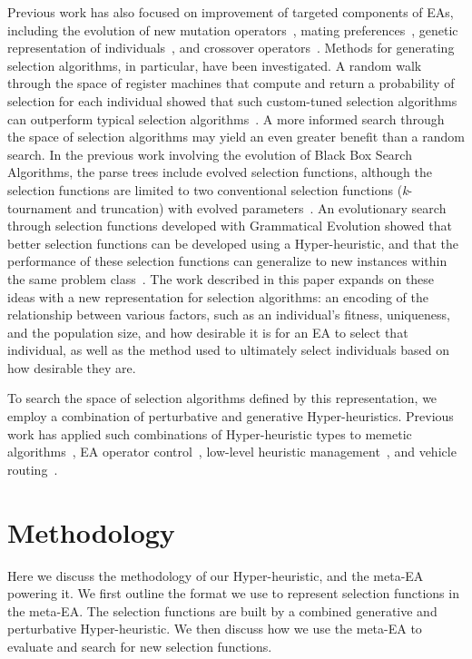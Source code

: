 \documentclass[sigconf]{acmart}
\begin{document}
Previous work has also focused on improvement of targeted components of EAs, including the evolution of new mutation operators~\citep{woodward2012mutationGeneration, hong2013probMutation}, mating preferences~\citep{guntly2011limp}, genetic representation of individuals~\citep{scott2015geneticRepresentations}, and crossover operators~\citep{goldman2011scc}. Methods for generating selection algorithms, in particular, have been investigated. A random walk through the space of register machines that compute and return a probability of selection for each individual showed that such custom-tuned selection algorithms can outperform typical selection algorithms~\citep{woodward2011selection}. A more informed search through the space of selection algorithms may yield an even greater benefit than a random search. In the previous work involving the evolution of Black Box Search Algorithms, the parse trees include evolved selection functions, although the selection functions are limited to two conventional selection functions (\textit{k}-tournament and truncation) with evolved parameters~\citep{martin2013evolvingBBSA}. An evolutionary search through selection functions developed with Grammatical Evolution showed that better selection functions can be developed using a Hyper-heuristic, and that the performance of these selection functions can generalize to new instances within the same problem class~\citep{lourencco2013selection}. The work described in this paper expands on these ideas with a new representation for selection algorithms: an encoding of the relationship between various factors, such as an individual's fitness, uniqueness, and the population size, and how desirable it is for an EA to select that individual, as well as the method used to ultimately select individuals based on how desirable they are. 

To search the space of selection algorithms defined by this representation, we employ a combination of perturbative and generative Hyper-heuristics. Previous work has applied such combinations of Hyper-heuristic types to memetic algorithms~\citep{krasnogor2004memetic}, EA operator control~\citep{maturana2010autonomous}, low-level heuristic management~\citep{remde2012empirical}, and vehicle routing~\citep{garrido2010vehicleRouting}. 

\section{Methodology}
\label{Methodology}

Here we discuss the methodology of our Hyper-heuristic, and the meta-EA powering it. We first outline the format we use to represent selection functions in the meta-EA. The selection functions are built by a combined generative and perturbative Hyper-heuristic. We then discuss how we use the meta-EA to evaluate and search for new selection functions. 
\end{document}
